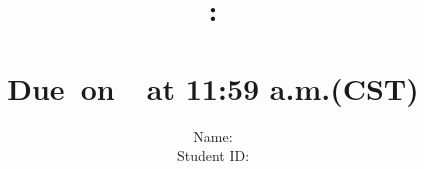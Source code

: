 \documentclass{article}
\title{
    \vspace{2in}
    \textmd{\textbf{\hmwkClass:\\  \hmwkTitle}} \\
    \normalsize\vspace{0.1in}\small{Due\ on\ \hmwkDueDate\ at 11:59 a.m.(CST)} \\
	\vspace{4in}
}
\author{
	Name: \textbf{\hmwkAuthorName} \\
	Student ID: \hmwkAuthorID}
\date{}
\begin{document}
\maketitle
\pagebreak















\end{document}
